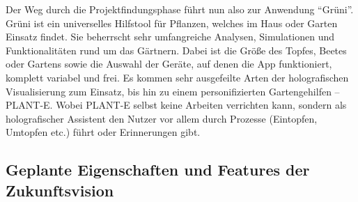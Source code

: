 Der Weg durch die Projektfindungsphase führt nun also zur Anwendung
``Grüni''. Grüni ist ein universelles Hilfstool für Pflanzen, welches im
Haus oder Garten Einsatz findet. Sie beherrscht sehr umfangreiche
Analysen, Simulationen und Funktionalitäten rund um das Gärtnern. Dabei
ist die Größe des Topfes, Beetes oder Gartens sowie die Auswahl der
Geräte, auf denen die App funktioniert, komplett variabel und frei. Es
kommen sehr ausgefeilte Arten der holografischen Visualisierung zum
Einsatz, bis hin zu einem personifizierten Gartengehilfen -- PLANT-E.
Wobei PLANT-E selbst keine Arbeiten verrichten kann, sondern als
holografischer Assistent den Nutzer vor allem durch Prozesse (Eintopfen,
Umtopfen etc.) führt oder Erinnerungen gibt.

\hypertarget{geplante-eigenschaften-und-features-der-zukunftsvision}{%
\subsection{Geplante Eigenschaften und Features der
Zukunftsvision}\label{geplante-eigenschaften-und-features-der-zukunftsvision}}

